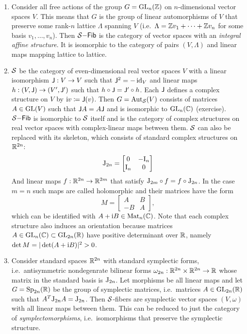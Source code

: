\begin{example}
\begin{enumerate}
        \item Consider all free actions of the group $G=\operatorname{GL}_n(\mathbb{Z})$ on $n$-dimensional vector spaces $V$. This means that $G$ is the group of linear automorphisms of $V$ that preserve some rank-$n$ lattice $\Lambda$ spanning $V$ (i.e.\ $\Lambda=\mathbb{Z} v_1+\cdots +\mathbb{Z} v_n$ for some basis $v_1,\ldots,v_n$). Then $\mathcal{S}\mathsf{-Fib}$ is the category of vector spaces with an \emph{integral affine structure}. It is isomorphic to the category of pairs $(V,\Lambda)$ and linear maps mapping lattice to lattice.

        \item $\mathcal{S}$ be the category of even-dimensional real vector spaces $V$ with a linear isomorphism $\mathsf{J}:V\to V$ such that $\mathsf{J}^2=-\operatorname{id}_V$ and linear maps $h:(V,\mathsf{J})\to(V',\mathsf{J}')$ such that $h\circ \mathsf{J}=\mathsf{J}'\circ h$. Each $\mathsf{J}$ defines a complex structure on $V$ by $\mathrm{i} v\coloneqq\mathsf{J}(v)$. Then $G=\operatorname{Aut}_{\mathcal{S}}(V)$ consists of matrices $A\in\operatorname{GL}(V)$ such that $\mathsf{J} A=A\mathsf{J}$ and is isomorphic to $\operatorname{GL}_n(\mathbb{C})$ (exercise). $\mathcal{S}\mathsf{-Fib}$ is isomorphic to $\mathcal{S}$ itself and is the category of complex structures on real vector spaces with complex-linear maps between them. $\mathcal{S}$ can also be replaced with its skeleton, which consists of standard complex structures on $\mathbb{R}^{2n}$:
        \[\mathrm{J}_{2n}=\begin{bmatrix}
            0&-\mathrm{I}_n\\
            \mathrm{I}_n&0
        \end{bmatrix}\]
        And linear maps $f:\mathbb{R}^{2n}\to \mathbb{R}^{2m}$ that satisfy $\mathrm{J}_{2m}\circ f=f\circ \mathrm{J}_{2n}$. In the case $m=n$ such maps are called holomorphic and their matrices have the form 
        \[M=\begin{bmatrix}
            A&B\\
            -B&A
        \end{bmatrix},\label{eq complex matrices}\]
        which can be identified with $A+\mathrm{i} B\in \operatorname{Mat}_n(\mathbb{C})$.
        Note that each complex structure also induces an orientation because matrices $A\in \operatorname{GL}_n(\mathbb{C})\subset \operatorname{GL}_{2n}(\mathbb{R})$ have positive determinant over $\mathbb{R}$, namely $\det M=|\det(A+\mathrm{i} B)|^2>0$.

        \item Consider standard spaces $\mathbb{R}^{2n}$ with standard symplectic forms, i.e.\ antisymmetric nondegenrate bilinear forms $\omega_{2n}:\mathbb{R}^{2n}\times \mathbb{R}^{2n}\to \mathbb{R}$ whose matrix in the standard basis is $\mathrm{J}_{2n}$. Let morphisms be all linear maps and let $G=\operatorname{Sp}_{2n}(\mathbb{R})$ be the group of symplectic matrices, i.e.\ matrices $A\in\operatorname{GL}_{2n}(\mathbb{R})$ such that $A^T\mathrm{J}_{2n}A=\mathrm{J}_{2n}$. Then $\mathcal{S}$-fibers are symplectic vector spaces $(V,\omega)$ with all linear maps between them. This can be reduced to just the category of \emph{symplectomorphisms}, i.e.\ isomorphisms that preserve the symplectic structure.
    \end{enumerate}
\end{example}


